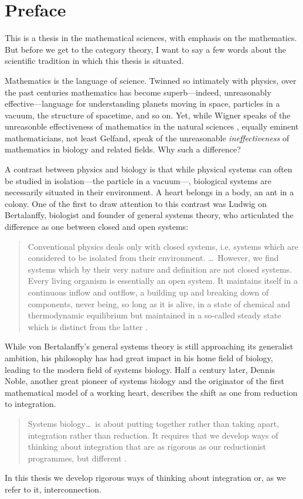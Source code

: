 {}
\chapter*{Preface}

This is a thesis in the mathematical sciences, with emphasis on the mathematics.
But before we get to the category theory, I want to say a few words about the
scientific tradition in which this thesis is situated.

Mathematics is the language of science. Twinned so intimately with physics, over
the past centuries mathematics has become superb---indeed, unreasonably
effective---language for understanding planets moving in space, particles in a
vacuum, the structure of spacetime, and so on.  Yet, while Wigner speaks of the
unreasonble effectiveness of mathematics in the natural sciences \cite{Wig60},
equally eminent mathematicians, not least Gelfand, speak of the unreasonable
\emph{ineffectiveness} of mathematics in biology and related fields. Why such a
difference?

A contrast between physics and biology is that while physical systems can often
be studied in isolation---the particle in a vacuum---, biological systems are
necessarily situated in their environment. A heart belongs in a body, an ant in
a colony. One of the first to draw attention to this contrast was Ludwig on
Bertalanffy, biologist and founder of general systems theory, who articulated
the difference as one between closed and open systems: 
\begin{quote}
  Conventional physics deals only with closed systems, i.e. systems which are
  considered to be isolated from their environment. \dots\ However, we find
  systems which by their very nature and definition are not closed systems.
  Every living organism is essentially an open system. It maintains itself in a
  continuous inflow and outflow, a building up and breaking down of components,
  never being, so long as it is alive, in a state of chemical and thermodynamic
  equilibrium but maintained in a so-called steady state which is distinct from
  the latter \cite{Ber68}.
\end{quote}
While von Bertalanffy's general systems theory is still approaching its
generalist ambition, his philosophy has had great impact in his home field of
biology, leading to the modern field of systems biology. Half a century later,
Dennis Noble, another great pioneer of systems biology and the originator of the
first mathematical model of a working heart, describes the shift as one from
reduction to integration.
\begin{quote}
  Systems biology\dots\ is about putting together rather than taking apart,
  integration rather than reduction. It requires that we develop ways of
  thinking about integration that are as rigorous as our reductionist
  programmes, but different \cite{Nob06}.
\end{quote}
In this thesis we develop rigorous ways of thinking about integration or, as we
refer to it, interconnection.

